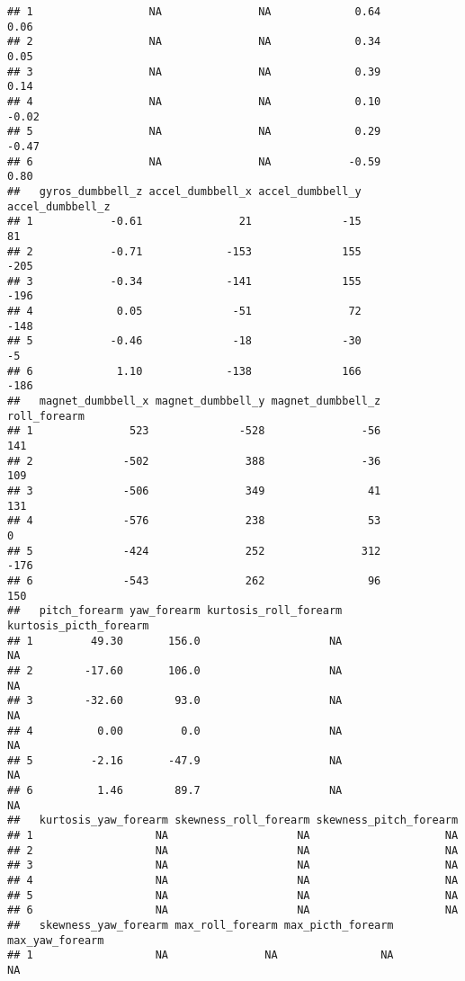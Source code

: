 \documentclass[]{article}
\begin{document}
\begin{verbatim}
## 1                  NA               NA             0.64             0.06
## 2                  NA               NA             0.34             0.05
## 3                  NA               NA             0.39             0.14
## 4                  NA               NA             0.10            -0.02
## 5                  NA               NA             0.29            -0.47
## 6                  NA               NA            -0.59             0.80
##   gyros_dumbbell_z accel_dumbbell_x accel_dumbbell_y accel_dumbbell_z
## 1            -0.61               21              -15               81
## 2            -0.71             -153              155             -205
## 3            -0.34             -141              155             -196
## 4             0.05              -51               72             -148
## 5            -0.46              -18              -30               -5
## 6             1.10             -138              166             -186
##   magnet_dumbbell_x magnet_dumbbell_y magnet_dumbbell_z roll_forearm
## 1               523              -528               -56          141
## 2              -502               388               -36          109
## 3              -506               349                41          131
## 4              -576               238                53            0
## 5              -424               252               312         -176
## 6              -543               262                96          150
##   pitch_forearm yaw_forearm kurtosis_roll_forearm kurtosis_picth_forearm
## 1         49.30       156.0                    NA                     NA
## 2        -17.60       106.0                    NA                     NA
## 3        -32.60        93.0                    NA                     NA
## 4          0.00         0.0                    NA                     NA
## 5         -2.16       -47.9                    NA                     NA
## 6          1.46        89.7                    NA                     NA
##   kurtosis_yaw_forearm skewness_roll_forearm skewness_pitch_forearm
## 1                   NA                    NA                     NA
## 2                   NA                    NA                     NA
## 3                   NA                    NA                     NA
## 4                   NA                    NA                     NA
## 5                   NA                    NA                     NA
## 6                   NA                    NA                     NA
##   skewness_yaw_forearm max_roll_forearm max_picth_forearm max_yaw_forearm
## 1                   NA               NA                NA              NA

\end{verbatim}
\end{document}
